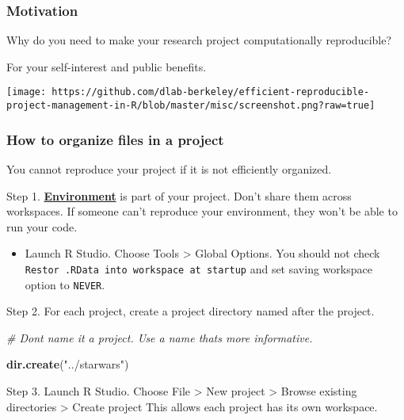 \documentclass[
]{book}
\newenvironment{Shaded}{\begin{snugshade}}{\end{snugshade}}
\newcommand{\CommentTok}[1]{\textcolor[rgb]{0.56,0.35,0.01}{\textit{#1}}}
\newcommand{\KeywordTok}[1]{\textcolor[rgb]{0.13,0.29,0.53}{\textbf{#1}}}
\newcommand{\NormalTok}[1]{#1}
\newcommand{\StringTok}[1]{\textcolor[rgb]{0.31,0.60,0.02}{#1}}
\providecommand{\tightlist}{%
  \setlength{\itemsep}{0pt}\setlength{\parskip}{0pt}}
\begin{document}
\hypertarget{motivation}{%
\subsubsection{Motivation}\label{motivation}}

Why do you need to make your research project computationally reproducible?

For your self-interest and public benefits.

\texttt{[image: https://github.com/dlab-berkeley/efficient-reproducible-project-management-in-R/blob/master/misc/screenshot.png?raw=true]}

\hypertarget{how-to-organize-files-in-a-project}{%
\subsubsection{How to organize files in a project}\label{how-to-organize-files-in-a-project}}

You cannot reproduce your project if it is not efficiently organized.

Step 1. \href{https://environments.rstudio.com/}{\textbf{Environment}} is part of your project. Don't share them across workspaces. If someone can't reproduce your environment, they won't be able to run your code.

\begin{itemize}
\tightlist
\item
  Launch R Studio. Choose Tools \textgreater{} Global Options. You should not check \texttt{Restor\ .RData\ into\ workspace\ at\ startup} and set saving workspace option to \texttt{NEVER}.
\end{itemize}

Step 2. For each project, create a project directory named after the project.

\begin{Shaded}
\begin{Highlighting}[]
\CommentTok{\# Don\textquotesingle{}t name it a project. Use a name that\textquotesingle{}s more informative.}

\KeywordTok{dir.create}\NormalTok{(}\StringTok{"../starwars"}\NormalTok{)}
\end{Highlighting}
\end{Shaded}

Step 3. Launch R Studio. Choose File \textgreater{} New project \textgreater{} Browse existing directories \textgreater{} Create project This allows each project has its own workspace.
\end{document}
